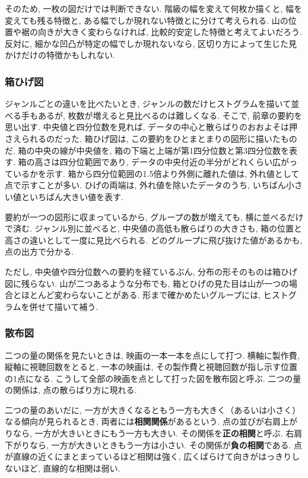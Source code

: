       そのため, 一枚の図だけでは判断できない.
      階級の幅を変えて何枚か描くと, 幅を変えても残る特徴と, ある幅でしか現れない特徴とに分けて考えられる.
      山の位置や裾の向きが大きく変わらなければ, 比較的安定した特徴と考えてよいだろう.
      反対に, 細かな凹凸が特定の幅でしか現れないなら, 区切り方によって生じた見かけだけの特徴かもしれない.

    \subsubsection*{箱ひげ図}

      ジャンルごとの違いを比べたいとき, ジャンルの数だけヒストグラムを描いて並べる手もあるが, 枚数が増えると見比べるのは難しくなる.
      そこで, 前章の要約を思い出す.
      中央値と四分位数を見れば, データの中心と散らばりのおおよそは押さえられるのだった.
      箱ひげ図は, この要約をひとまとまりの図形に描いたものだ.
      箱の中央の線が中央値を, 箱の下端と上端が第1四分位数と第3四分位数を表す.
      箱の高さは四分位範囲であり, データの中央付近の半分がどれくらい広がっているかを示す.
      箱から四分位範囲の1.5倍より外側に離れた値は, 外れ値として点で示すことが多い.
      ひげの両端は, 外れ値を除いたデータのうち, いちばん小さい値といちばん大きい値を表す.

      要約が一つの図形に収まっているから, グループの数が増えても, 横に並べるだけで済む.
      ジャンル別に並べると, 中央値の高低も散らばりの大きさも, 箱の位置と高さの違いとして一度に見比べられる.
      どのグループに飛び抜けた値があるかも, 点の出方で分かる.

      ただし, 中央値や四分位数への要約を経ているぶん, 分布の形そのものは箱ひげ図に残らない.
      山が二つあるような分布でも, 箱とひげの見た目は山が一つの場合とほとんど変わらないことがある.
      形まで確かめたいグループには, ヒストグラムを併せて描いて補う.

    \subsubsection*{散布図}

      二つの量の関係を見たいときは, 映画の一本一本を点にして打つ.
      横軸に製作費, 縦軸に視聴回数をとると, 一本の映画は, その製作費と視聴回数が指し示す位置の1点になる.
      こうして全部の映画を点として打った図を散布図と呼ぶ.
      二つの量の関係は, 点の散らばり方に現れる.

      二つの量のあいだに, 一方が大きくなるともう一方も大きく（あるいは小さく）なる傾向が見られるとき, 両者には\textbf{相関関係}があるという.
      点の並びが右肩上がりなら, 一方が大きいときにもう一方も大きい. その関係を\textbf{正の相関}と呼ぶ.
      右肩下がりなら, 一方が大きいときもう一方は小さい. その関係が\textbf{負の相関}である.
      点が直線の近くにまとまっているほど相関は強く, 広くばらけて向きがはっきりしないほど, 直線的な相関は弱い.

